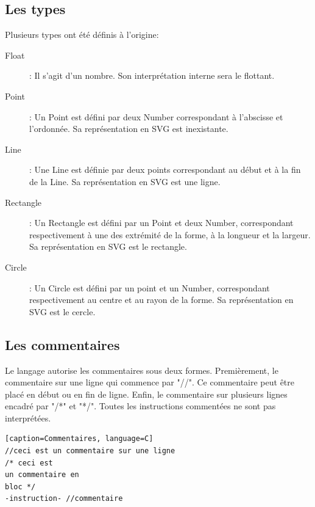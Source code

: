 \documentclass[11pt]{report} %
\begin{document}
\subsection{Les types}
Plusieurs types ont été définis à l'origine:
\begin{description}
\item[Float]: Il s'agit d'un nombre. Son interprétation interne sera le flottant.
\item[Point]: Un Point est défini par deux Number correspondant à l'abscisse et l'ordonnée. Sa représentation en SVG est inexistante.
\item[Line]: Une Line est définie par deux points correspondant au début et à la fin de la Line. Sa représentation en SVG est une ligne.
\item[Rectangle]: Un Rectangle est défini par un Point et deux Number, correspondant respectivement à une des extrémité de la forme, à la longueur et la largeur. Sa représentation en SVG est le rectangle.
\item[Circle]: Un Circle est défini par un point et un Number, correspondant respectivement au centre et au rayon de la forme. Sa représentation en SVG est le cercle.
\end{description}

\subsection{Les commentaires}
Le langage autorise les commentaires sous deux formes. Premièrement, le commentaire sur une ligne qui commence par "//". Ce commentaire peut être placé en début ou en fin de ligne. Enfin, le commentaire sur plusieurs lignes encadré par "/*" et "*/". Toutes les instructions commentées ne sont pas interprétées.
\begin{lstlisting}[firstnumber=1][caption=Commentaires, language=C]
//ceci est un commentaire sur une ligne
/* ceci est
un commentaire en
bloc */
-instruction- //commentaire
\end{lstlisting}
\end{document}
